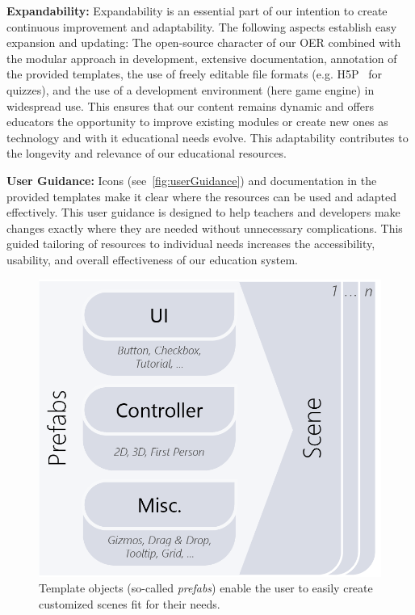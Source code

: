 \textbf{Expandability:}
Expandability is an essential part of our intention to create continuous improvement and adaptability. The following aspects establish easy expansion and updating: The open-source character of our OER combined with the modular approach in development, extensive documentation, annotation of the provided templates, the use of freely editable file formats (e.g. H5P~\cite{Singleton_Charlton_2019} for quizzes), and the use of a development environment (here game engine) in widespread use. This ensures that our content remains dynamic and offers educators the opportunity to improve existing modules or create new ones as technology and with it educational needs evolve. This adaptability contributes to the longevity and relevance of our educational resources.

\textbf{User Guidance:}
Icons (see~\autoref{fig:userGuidance}) and documentation in the provided templates make it clear where the resources can be used and adapted effectively. This user guidance is designed to help teachers and developers make changes exactly where they are needed without unnecessary complications. This guided tailoring of resources to individual needs increases the accessibility, usability, and overall effectiveness of our education system.
\begin{figure}[b]
	\centering
	\includegraphics[width=\linewidth]{pictures/unityPrefabs.png}
	\captionsetup{labelfont=bf,textfont=it}
	\caption{Template objects (so-called \emph{prefabs}) enable the user to easily create customized scenes fit for their needs. \label{fig:unityPrefabs}}
\end{figure}
